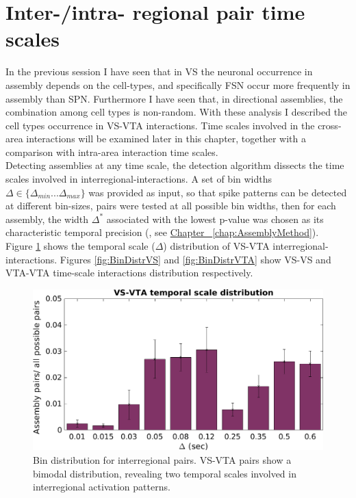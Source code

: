 \section{Inter-/intra- regional pair time scales}
\label{sec:TimeScales}
In the previous session I have seen that in VS the neuronal occurrence in assembly depends on the cell-types, and specifically FSN occur more frequently in assembly than SPN. Furthermore I have seen that, in directional assemblies, the combination among cell types is non-random. With these analysis I described the cell types occurrence in VS-VTA interactions. Time scales involved in the cross-area interactions will be examined later in this chapter, together with a comparison with intra-area interaction time scales.\\
Detecting assemblies at any time scale, the detection algorithm dissects the time scales involved in interregional-interactions. A set of bin widths $\Delta \in \{\Delta_{min}...\Delta_{max}\}$ was provided as input, so that spike patterns can be detected at different bin-sizes, pairs were tested at all possible bin widths, then for each assembly, the width $\Delta^*$ associated with the lowest p-value was chosen as its characteristic temporal precision (\cite{RussoDurstewitz}, see \hyperref[chap:AssemblyMethod]{Chapter~ \ref*{chap:AssemblyMethod}}).\\
Figure \ref{fig:BinDistr} shows the temporal scale ($\Delta$) distribution of VS-VTA interregional-interactions. Figures \ref{fig:BinDistrVS} and \ref{fig:BinDistrVTA} show VS-VS and VTA-VTA time-scale interactions distribution respectively.
\begin{figure}[H]
\centering
\includegraphics[scale=0.46]{figures/VS_VTA_Short1.png}
\caption{Bin distribution for interregional pairs. VS-VTA pairs show a bimodal distribution, revealing two temporal scales involved in interregional activation patterns.}
\label{fig:BinDistr}
\end{figure}
